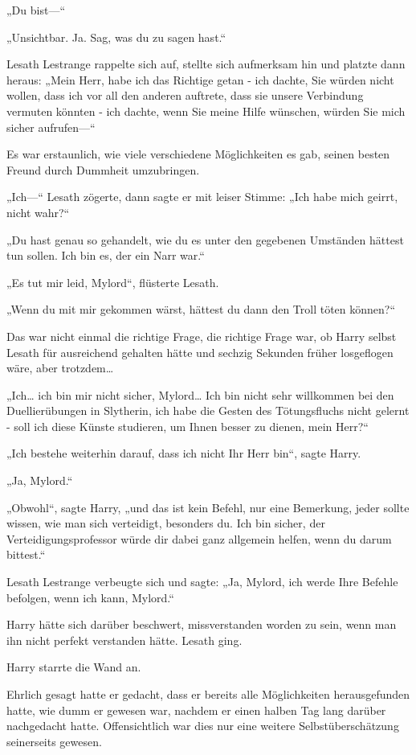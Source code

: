 {„Du bist—“

„Unsichtbar. Ja. Sag, was du zu sagen hast.“

Lesath Lestrange rappelte sich auf, stellte sich aufmerksam hin und platzte dann heraus: „Mein Herr, habe ich das Richtige getan - ich dachte, Sie würden nicht wollen, dass ich vor all den anderen auftrete, dass sie unsere Verbindung vermuten könnten - ich dachte, wenn Sie meine Hilfe wünschen, würden Sie mich sicher aufrufen—“

Es war erstaunlich, wie viele verschiedene Möglichkeiten es gab, seinen besten Freund durch Dummheit umzubringen.

„Ich—“ Lesath zögerte, dann sagte er mit leiser Stimme: „Ich habe mich geirrt, nicht wahr?“

„Du hast genau so gehandelt, wie du es unter den gegebenen Umständen hättest tun sollen. Ich bin es, der ein Narr war.“

„Es tut mir leid, Mylord“, flüsterte Lesath.

„Wenn du mit mir gekommen wärst, hättest du dann den Troll töten können?“

Das war nicht einmal die richtige Frage, die richtige Frage war, ob Harry selbst Lesath für ausreichend gehalten hätte und sechzig Sekunden früher losgeflogen wäre, aber trotzdem…

„Ich… ich bin mir nicht sicher, Mylord… Ich bin nicht sehr willkommen bei den Duellierübungen in Slytherin, ich habe die Gesten des Tötungsfluchs nicht gelernt - soll ich diese Künste studieren, um Ihnen besser zu dienen, mein Herr?“

„Ich bestehe weiterhin darauf, dass ich nicht Ihr Herr bin“, sagte Harry.

„Ja, Mylord.“

„Obwohl“, sagte Harry, „und das ist kein Befehl, nur eine Bemerkung, jeder sollte wissen, wie man sich verteidigt, besonders du. Ich bin sicher, der Verteidigungsprofessor würde dir dabei ganz allgemein helfen, wenn du darum bittest.“

Lesath Lestrange verbeugte sich und sagte: „Ja, Mylord, ich werde Ihre Befehle befolgen, wenn ich kann, Mylord.“

Harry hätte sich darüber beschwert, missverstanden worden zu sein, wenn man ihn nicht perfekt verstanden hätte. Lesath ging.

Harry starrte die Wand an.

Ehrlich gesagt hatte er gedacht, dass er bereits alle Möglichkeiten herausgefunden hatte, wie dumm er gewesen war, nachdem er einen halben Tag lang darüber nachgedacht hatte. Offensichtlich war dies nur eine weitere Selbstüberschätzung seinerseits gewesen.

}
